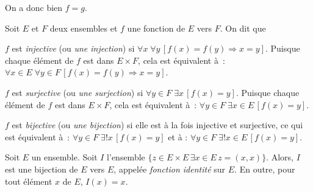     On a donc bien $f = g$. 

   \done 

\blank[medium]

Soit $E$ et $F$ deux ensembles et $f$ une fonction de $E$ vers $F$. 
On dit que
\startitemize[nowhite]
    \item $f$ est \emph{injective} (ou \emph{une injection}) si $\forall x \; \forall y \, [f(x) = f(y) \Rightarrow x = y]$.
        Puisque chaque élément de $f$ est dans $E \times F$, cela est équivalent à : $\forall x \in E \; \forall y \in F \, [f(x) = f(y) \Rightarrow x = y]$.
    \item $f$ est \emph{surjective} (ou \emph{une surjection}) si $\forall y \in F \; \exists x \, [f(x) = y]$.
        Puisque chaque élément de $f$ est dans $E \times F$, cela est équivalent à : $\forall y \in F \; \exists x \in E \, [f(x) = y]$.
    \item $f$ est \emph{bijective} (ou \emph{une bijection}) si elle est à la fois injective et surjective, ce qui est équivalent à : $\forall y \in F \; \exists ! x \, [f(x) = y]$ et à : $\forall y \in F \; \exists ! x \in E \, [f(x) = y]$.
\stopitemize

\blank[medium]

\noindent{} Soit $E$ un ensemble. 
    Soit $I$ l'ensemble $\lbrace z \in E \times E \, \exists x \in E \, z = (x,x) \rbrace$. 
    Alors, $I$ est une bijection de $E$ vers $E$, appelée \emph{fonction identité} sur $E$. 
    En outre, pour tout élément $x$ de $E$, $I(x) = x$.

\blank[medium]

